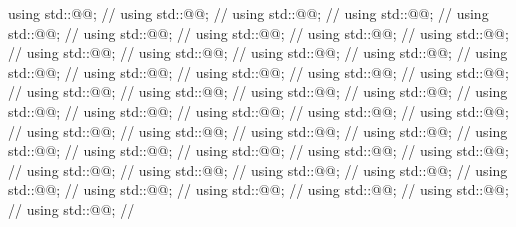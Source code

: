 \begin{codeblock}
using std::@@;              // \seebelow
using std::@@;              // \seebelow
using std::@@;             // \seebelow
using std::@@;             // \seebelow
using std::@@;             // \seebelow
using std::@@;            // \seebelow
using std::@@;               // \seebelow
using std::@@;              // \seebelow
using std::@@;              // \seebelow
using std::@@;             // \seebelow
using std::@@;             // \seebelow
using std::@@;            // \seebelow
using std::@@;           // \seebelow
using std::@@;          // \seebelow
using std::@@;          // \seebelow
using std::@@;           // \seebelow
using std::@@;            // \seebelow
using std::@@;           // \seebelow
using std::@@;           // \seebelow
using std::@@;          // \seebelow
using std::@@;           // \seebelow
using std::@@;          // \seebelow
using std::@@;           // \seebelow
using std::@@;          // \seebelow
using std::@@;      // \seebelow
using std::@@;     // \seebelow
using std::@@;     // \seebelow
using std::@@;    // \seebelow
using std::@@;     // \seebelow
using std::@@;    // \seebelow
using std::@@;     // \seebelow
using std::@@;    // \seebelow
using std::@@;       // \seebelow
using std::@@;      // \seebelow
using std::@@;      // \seebelow
using std::@@;     // \seebelow
using std::@@;      // \seebelow
using std::@@;     // \seebelow
using std::@@;      // \seebelow
using std::@@;     // \seebelow
using std::@@;          // \seebelow
using std::@@;         // \seebelow
using std::@@;            // \seebelow
using std::@@;         // \seebelow
using std::@@;          // \seebelow
using std::@@;         // \seebelow


\end{codeblock}
